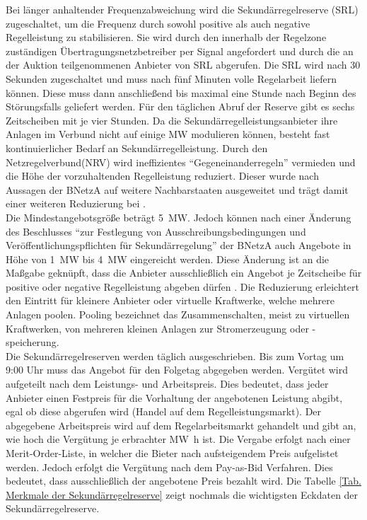 			Bei länger anhaltender Frequenzabweichung wird die Sekundärregelreserve (SRL) zugeschaltet, um die Frequenz durch sowohl positive als auch negative Regelleistung zu stabilisieren.
			Sie wird durch den innerhalb der Regelzone zuständigen Übertragungsnetzbetreiber per Signal angefordert und durch die an der Auktion teilgenommenen Anbieter von SRL abgerufen. 
			Die SRL wird nach \num{30} Sekunden zugeschaltet und muss nach fünf Minuten volle Regelarbeit liefern können. 
			Diese muss dann anschließend bis maximal eine Stunde nach Beginn des Störungsfalls geliefert werden. 
			Für den täglichen Abruf der Reserve gibt es sechs Zeitscheiben mit je vier Stunden.
			Da die Sekundärregelleistungsanbieter ihre Anlagen im Verbund nicht auf einige \si{\mega\watt} modulieren können, besteht fast kontinuierlicher Bedarf an Sekundärregelleistung.
			Durch den Netzregelverbund(NRV) wird ineffizientes "`Gegeneinanderregeln"' vermieden und die Höhe der vorzuhaltenden Regelleistung reduziert.
			Dieser wurde nach Aussagen der BNetzA auf weitere Nachbarstaaten ausgeweitet und trägt damit einer weiteren Reduzierung bei \cite{Monitoringbericht_BNetzA}. \\
			
			Die Mindestangebotsgröße beträgt \SI{5}{\mega\watt}.
			Jedoch können nach einer Änderung des Beschlusses "`zur Festlegung von Ausschreibungsbedingungen und Veröffentlichungspflichten für Sekundärregelung"' der BNetzA auch Angebote in Höhe von \SI{1}{\mega\watt} bis \SI{4}{\mega\watt} eingereicht werden.
			Diese Änderung ist an die Maßgabe geknüpft, dass die Anbieter ausschließlich ein Angebot je Zeitscheibe für positive oder negative Regelleistung abgeben dürfen \parencite{Beschluss_SRL}.
			Die Reduzierung erleichtert den Eintritt für kleinere Anbieter oder virtuelle Kraftwerke, welche mehrere Anlagen poolen.
			Pooling bezeichnet das Zusammenschalten, meist zu virtuellen Kraftwerken, von mehreren kleinen Anlagen zur Stromerzeugung oder -speicherung. \\
			
			Die Sekundärregelreserven werden täglich ausgeschrieben. 
			Bis zum Vortag um 9:00 Uhr muss das Angebot für den Folgetag abgegeben werden.
			Vergütet wird aufgeteilt nach dem Leistungs- und Arbeitspreis.
			Dies bedeutet, dass jeder Anbieter einen Festpreis für die Vorhaltung der angebotenen Leistung abgibt, egal ob diese abgerufen wird (Handel auf dem Regelleistungsmarkt).
			Der abgegebene Arbeitspreis wird auf dem Regelarbeitsmarkt gehandelt und gibt an, wie hoch die Vergütung je erbrachter \si{\mega\watt\hour} ist.
			Die Vergabe erfolgt nach einer Merit-Order-Liste, in welcher die Bieter nach aufsteigendem Preis aufgelistet werden.
			Jedoch erfolgt die Vergütung nach dem Pay-as-Bid Verfahren.
			Dies bedeutet, dass ausschließlich der angebotene Preis bezahlt wird.
			Die Tabelle \ref{Tab. Merkmale der Sekundärregelreserve} zeigt nochmals die wichtigsten Eckdaten der Sekundärregelreserve.
			
